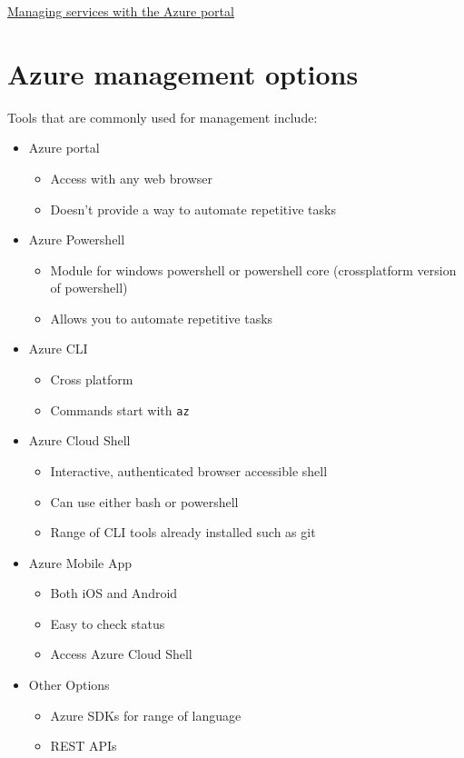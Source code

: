 \documentclass{article}[18pt]
\begin{document}
\begin{center}
\underline{\huge Managing services with the Azure portal}
\end{center}

\section{Azure management options}

Tools that are commonly used for management include:
\begin{itemize}
	\item Azure portal
	\begin{itemize}
		\item Access with any web browser
		\item Doesn't provide a way to automate repetitive tasks
	\end{itemize}
	\item Azure Powershell
	\begin{itemize}
		\item Module for windows powershell or powershell core (crossplatform version of powershell)
		\item Allows you to automate repetitive tasks
	\end{itemize}
	\item Azure CLI
	\begin{itemize}
		\item Cross platform
		\item Commands start with \texttt{az}
	\end{itemize}
	\item Azure Cloud Shell
	\begin{itemize}
		\item Interactive, authenticated browser accessible shell
		\item Can use either bash or powershell
		\item Range of CLI tools already installed such as git
	\end{itemize}
	\item Azure Mobile App
	\begin{itemize}
		\item Both iOS and Android
		\item Easy to check status
		\item Access Azure Cloud Shell
	\end{itemize}
	\item Other Options
	\begin{itemize}
		\item Azure SDKs for range of language
		\item REST APIs
	\end{itemize}
\end{itemize}
\end{document}
